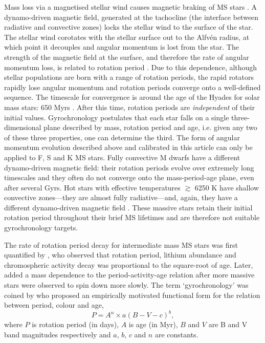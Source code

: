 \documentclass[11pt,preprint]{aastex}
\begin{document}
Mass loss via a magnetised stellar wind causes magnetic braking of MS stars
\citep{Weber1967}.
A dynamo-driven magnetic field, generated at the tachocline (the interface
between radiative and convective zones) locks the stellar wind to the surface
of the star.
The stellar wind corotates with the stellar surface out to the Alfv\'{e}n
radius, at which point it decouples and angular momentum is lost from the
star.
The strength of the magnetic field at the surface, and therefore the rate of
angular momentum loss, is related to rotation period \citep{Kawaler1988}.
Due to this dependence, although stellar populations are born with a range of
rotation periods, the rapid rotators rapidly lose angular momentum and
rotation periods converge onto a well-defined sequence.
The timescale for convergence is around the age of the Hyades for solar mass
stars: 650 Myrs \citep{Radick1987, Irwin2009}.
After this time, rotation periods are \emph{independent} of their initial
values.
Gyrochronology postulates that each star falls on a single three-dimensional
plane described by mass, rotation period and age, i.e. given any two of these
three properties, one can determine the third.
The form of angular momentum evolution described above and calibrated in this
article can only be applied to F, S and K MS stars.
Fully convective M dwarfs have a different dynamo-driven magnetic field: their
rotation periods evolve over extremely long timescales and they often do not
converge onto the mass-period-age plane, even after several Gyrs.
Hot stars with effective temperatures $\gtrsim$ 6250 K have shallow convective
zones---they are almost fully radiative---and, again, they have a different
dynamo-driven magnetic field \citep{Kraft1967}.
These massive stars retain their initial rotation period throughout their
brief MS lifetimes and are therefore not suitable gyrochronology targets.

The rate of rotation period decay for intermediate mass MS stars was first
quantified by \citet{Skumanich1972}, who observed that rotation period,
lithium abundance and chromospheric activity decay was proportional to the
square-root of age.
Later, \citet{Noyes1984_2} added a mass dependence to the period-activity-age
relation after more massive stars were observed to spin down more slowly.
The term `gyrochronology' was coined by \citet{Barnes2003} who proposed an
empirically motivated functional form for the relation between period, colour
and age, \begin{equation} \label{eq:Barnes2007_2} P = A^n \times a(B-V-c)^b,
\end{equation} where $P$ is rotation period (in days), $A$ is age (in Myr),
$B$ and $V$ are B and V band magnitudes respectively and $a$, $b$, $c$ and $n$
are constants.
\end{document}

